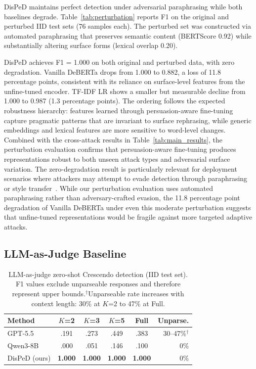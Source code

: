 DisPeD maintains perfect detection under adversarial paraphrasing while both baselines degrade.
Table~\ref{tab:perturbation} reports F1 on the original and perturbed IID test sets (76 samples each).
The perturbed set was constructed via automated paraphrasing that preserves semantic content (BERTScore 0.92) while substantially altering surface forms (lexical overlap 0.20).

DisPeD achieves F1 = 1.000 on both original and perturbed data, with zero degradation.
Vanilla DeBERTa drops from 1.000 to 0.882, a loss of 11.8 percentage points, consistent with its reliance on surface-level features from the unfine-tuned encoder.
TF-IDF LR shows a smaller but measurable decline from 1.000 to 0.987 (1.3 percentage points).
The ordering follows the expected robustness hierarchy: features learned through persuasion-aware fine-tuning capture pragmatic patterns that are invariant to surface rephrasing, while generic embeddings and lexical features are more sensitive to word-level changes.
Combined with the cross-attack results in Table~\ref{tab:main_results}, the perturbation evaluation confirms that persuasion-aware fine-tuning produces representations robust to both unseen attack types and adversarial surface variation.
The zero-degradation result is particularly relevant for deployment scenarios where attackers may attempt to evade detection through paraphrasing or style transfer~\citep{nasr2025attackermovessecond}.
While our perturbation evaluation uses automated paraphrasing rather than adversary-crafted evasion, the 11.8 percentage point degradation of Vanilla DeBERTa under even this moderate perturbation suggests that unfine-tuned representations would be fragile against more targeted adaptive attacks.

\subsection{LLM-as-Judge Baseline}
\label{sec:llm_judge}

\begin{table}[t]
\centering
\small
\caption{LLM-as-judge zero-shot Crescendo detection (IID test set). F1 values exclude unparseable responses and therefore represent upper bounds.$^{\dagger}$Unparseable rate increases with context length: 30\% at $K$=2 to 47\% at Full.}
\label{tab:llm_judge}
\begin{tabular}{@{}lccccr@{}}
\toprule
\textbf{Method} & $K$=2 & $K$=3 & $K$=5 & Full & Unparse. \\
\midrule
GPT-5.5 & .191 & .273 & .449 & .383 & 30--47\%$^{\dagger}$ \\
Qwen3-8B & .000 & .051 & .146 & .100 & 0\% \\
\midrule
DisPeD (ours) & \textbf{1.000} & \textbf{1.000} & \textbf{1.000} & \textbf{1.000} & 0\% \\
\bottomrule
\end{tabular}
\end{table}

